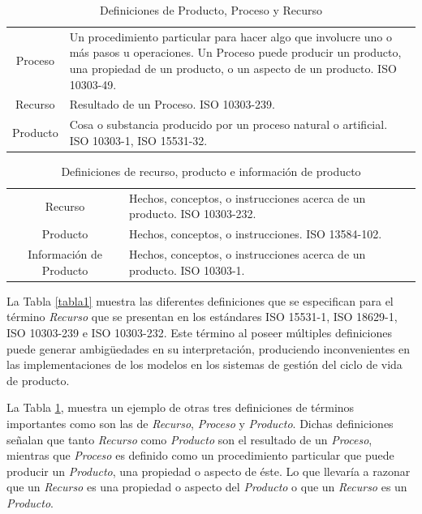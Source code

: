 \documentclass[journal]{IEEEtran}
\begin{document}
\begin{table}[!t]
\renewcommand{\arraystretch}{1.3}
\caption{Definiciones de Producto, Proceso y Recurso}
\label{tabla2}
\centering
\begin{tabular}{|c|p{6cm}|}
\hline
Proceso & Un procedimiento particular para hacer algo que involucre uno o m\'as pasos u operaciones. Un Proceso puede producir un producto, una propiedad de un producto, o un aspecto de un producto. ISO 10303-49.\\ \cline{1-2}
Recurso                         & Resultado de un Proceso. ISO 10303-239.\\ \cline{1-2}
Producto                         & Cosa o substancia producido por un proceso natural o artificial. ISO 10303-1, ISO 15531-32. \\  \hline                                                                                                     
\end{tabular}
\end{table}

\begin{table}[!t]
\renewcommand{\arraystretch}{1.3}
\caption{Definiciones de recurso, producto e informaci\'on de producto}
\label{tabla3}
\centering
\begin{tabular}{|c|p{4cm}|}
\hline
Recurso & Hechos, conceptos, o instrucciones acerca de un producto. ISO 10303-232.\\ \cline{1-2}
Producto & Hechos, conceptos, o instrucciones. ISO 13584-102.\\ \cline{1-2}
Informaci\'on de Producto & Hechos, conceptos, o instrucciones acerca de un producto. ISO 10303-1. \\  \hline                                                                                                     
\end{tabular}
\end{table}

La Tabla \ref{tabla1} muestra las diferentes definiciones que se especifican para el t\'ermino \emph{Recurso} que se presentan en los est\'andares ISO 15531-1, ISO 18629-1, ISO 10303-239 e ISO 10303-232. Este t\'ermino al poseer m\'ultiples definiciones puede generar ambig\"uedades en su interpretaci\'on, produciendo inconvenientes en las implementaciones de los modelos en los sistemas de gesti\'on del ciclo de vida de producto. 

La Tabla \ref{tabla2}, muestra un ejemplo de otras tres definiciones de t\'erminos importantes como son las de \emph{Recurso}, \emph{Proceso} y \emph{Producto}. Dichas definiciones se\~nalan que tanto \emph{Recurso} como \emph{Producto} son el resultado de un \emph{Proceso}, mientras que \emph{Proceso} es definido como un procedimiento particular que puede producir un \emph{Producto}, una propiedad o aspecto de \'este. Lo que llevar\'ia a razonar que un \emph{Recurso} es una propiedad o aspecto del \emph{Producto} o que un \emph{Recurso} es un \emph{Producto}. 
\end{document}
